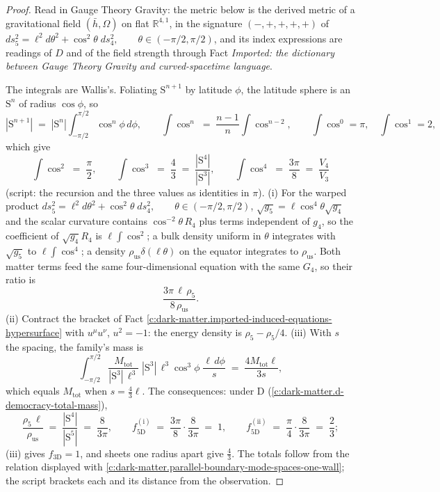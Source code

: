 \documentclass[11pt]{article}
\theoremstyle{definition}
\theoremstyle{plain}
\providecommand{\R}{}\renewcommand{\R}{\mathbb{R}}
\providecommand{\Sph}{}\renewcommand{\Sph}{\mathrm{S}}
\providecommand{\hb}{}\renewcommand{\hb}{\bar{h}}
\begin{document}
\begin{proof}
Read in Gauge Theory Gravity: the metric below is the derived metric of a gravitational field $(\hb, \Omega)$ on flat $\R^{4,1}$, in the signature $(-,+,+,+,+)$ of $ds_{5}^{2} = \ell^{2}d\theta^{2} + \cos^{2}\theta\; ds_{4}^{2}, \qquad \theta \in (-\pi/2, \pi/2)$, and its index expressions are readings of $D$ and of the field strength through Fact \emph{Imported: the dictionary between Gauge Theory Gravity and curved-spacetime language}.

The integrals are Wallis's. Foliating $\Sph^{n+1}$ by latitude $\phi$, the latitude sphere is an $\Sph^{n}$ of radius $\cos\phi$, so
\[
|\Sph^{n+1}| \;=\; |\Sph^{n}|\int_{-\pi/2}^{\pi/2}\cos^{n}\phi\,d\phi, \qquad \int\cos^{n} \;=\; \frac{n-1}{n}\int\cos^{n-2}, \qquad \int\cos^{0} = \pi, \quad \int\cos^{1} = 2,
\]
which give
\[
\int\cos^{2} \;=\; \frac{\pi}{2}, \qquad \int\cos^{3} \;=\; \frac{4}{3} \;=\; \frac{|\Sph^{4}|}{|\Sph^{3}|}, \qquad \int\cos^{4} \;=\; \frac{3\pi}{8} \;=\; \frac{V_{4}}{V_{3}}
\]
(script: the recursion and the three values as identities in $\pi$). (i) For the warped product $ds_{5}^{2} = \ell^{2}d\theta^{2} + \cos^{2}\theta\; ds_{4}^{2}, \qquad \theta \in (-\pi/2, \pi/2)$, $\sqrt{g_{5}} = \ell\cos^{4}\theta\sqrt{g_{4}}$ and the scalar curvature contains $\cos^{-2}\theta\,R_{4}$ plus terms independent of $g_{4}$, so the coefficient of $\sqrt{g_{4}}R_{4}$ is $\ell\int\cos^{2}$; a bulk density uniform in $\theta$ integrates with $\sqrt{g_{5}}$ to $\ell\int\cos^{4}$; a density $\rho_{\mathrm{us}}\delta(\ell\theta)$ on the equator integrates to $\rho_{\mathrm{us}}$. Both matter terms feed the same four-dimensional equation with the same $G_{4}$, so their ratio is
\[
\frac{3\pi\,\ell\,\rho_{5}}{8\,\rho_{\mathrm{us}}}.
\]
(ii) Contract the bracket of Fact \ref{c:dark-matter.imported-induced-equations-hypersurface} with $u^{\mu}u^{\nu}$, $u^{2} = -1$: the energy density is $\rho_{5} - \rho_{5}/4$. (iii) With $s$ the spacing, the family's mass is
\[
\int_{-\pi/2}^{\pi/2}\frac{M_{\mathrm{tot}}}{|\Sph^{3}|\,\ell^{3}}\;|\Sph^{3}|\,\ell^{3}\cos^{3}\phi\;\frac{\ell\,d\phi}{s}
\;=\; \frac{4M_{\mathrm{tot}}\ell}{3s},
\]
which equals $M_{\mathrm{tot}}$ when $s = \tfrac{4}{3}\ell$. The consequences: under D (\ref{c:dark-matter.d-democracy-total-mass}),
\[
\frac{\rho_{5}\,\ell}{\rho_{\mathrm{us}}} \;=\; \frac{|\Sph^{4}|}{|\Sph^{5}|} \;=\; \frac{8}{3\pi}, \qquad
f_{5\mathrm{D}}^{\mathrm{(i)}} \;=\; \frac{3\pi}{8}\cdot\frac{8}{3\pi} \;=\; 1, \qquad
f_{5\mathrm{D}}^{\mathrm{(ii)}} \;=\; \frac{\pi}{4}\cdot\frac{8}{3\pi} \;=\; \frac{2}{3};
\]
(iii) gives $f_{3\mathrm{D}} = 1$, and sheets one radius apart give $\tfrac{4}{3}$. The totals follow from the relation displayed with \ref{c:dark-matter.parallel-boundary-mode-spaces-one-wall}; the script brackets each and its distance from the observation.

\end{proof}
\end{document}
